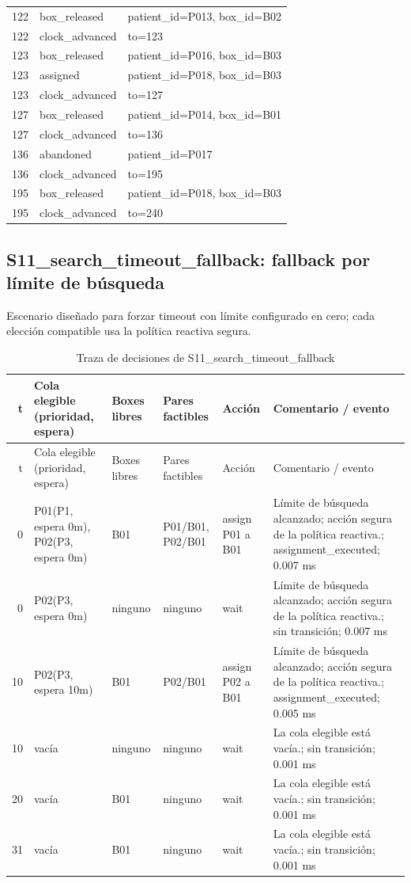 \begin{longtable}{r p{2.2cm} p{4.2cm}}
122 & box\_released & patient\_id=P013, box\_id=B02 \\
122 & clock\_advanced & to=123 \\
123 & box\_released & patient\_id=P016, box\_id=B03 \\
123 & assigned & patient\_id=P018, box\_id=B03 \\
123 & clock\_advanced & to=127 \\
127 & box\_released & patient\_id=P014, box\_id=B01 \\
127 & clock\_advanced & to=136 \\
136 & abandoned & patient\_id=P017 \\
136 & clock\_advanced & to=195 \\
195 & box\_released & patient\_id=P018, box\_id=B03 \\
195 & clock\_advanced & to=240 \\
\bottomrule
\end{longtable}

\subsection{S11\_search\_timeout\_fallback: fallback por límite de búsqueda}
Escenario diseñado para forzar timeout con límite configurado en cero; cada elección compatible usa la política reactiva segura.
\begin{longtable}{r p{3.0cm} p{1.25cm} p{2.7cm} p{2.0cm} p{2.4cm}}
\caption{Traza de decisiones de S11\_search\_timeout\_fallback}\label{tab:trace_s11_search_timeout_fallback}\\
\toprule t & Cola elegible (prioridad, espera) & Boxes libres & Pares factibles & Acción & Comentario / evento \\
\midrule\endfirsthead
\toprule t & Cola elegible (prioridad, espera) & Boxes libres & Pares factibles & Acción & Comentario / evento \\
\midrule\endhead
0 & P01(P1, espera 0m), P02(P3, espera 0m) & B01 & P01/B01, P02/B01 & assign P01 a B01 & Límite de búsqueda alcanzado; acción segura de la política reactiva.; assignment\_executed; 0.007 ms \\
0 & P02(P3, espera 0m) & ninguno & ninguno & wait & Límite de búsqueda alcanzado; acción segura de la política reactiva.; sin transición; 0.007 ms \\
10 & P02(P3, espera 10m) & B01 & P02/B01 & assign P02 a B01 & Límite de búsqueda alcanzado; acción segura de la política reactiva.; assignment\_executed; 0.005 ms \\
10 & vacía & ninguno & ninguno & wait & La cola elegible está vacía.; sin transición; 0.001 ms \\
20 & vacía & B01 & ninguno & wait & La cola elegible está vacía.; sin transición; 0.001 ms \\
31 & vacía & B01 & ninguno & wait & La cola elegible está vacía.; sin transición; 0.001 ms \\
\bottomrule
\end{longtable}
